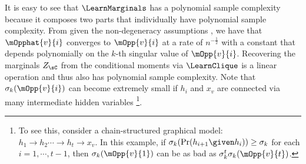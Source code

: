 It is easy to see that $\LearnMarginals$ has a polynomial sample complexity because it composes two parts that individually have polynomial sample complexity.
From \citet{anandkumar13tensor} given the non-degeneracy assumptions
  , we have that $\mOpphat{v}{i}$
  converges to $\mOpp{v}{i}$ at a rate of $n^{-\frac12}$ with a constant
  that depends polynomially on the $k$-th singular value of
  $\mOpp{v}{i}$.
Recovering the marginals $Z_\sC$ from the conditional moments via $\LearnClique$ is a linear operation and thus also has polynomial sample complexity. 
Note that $\sigma_{k}(\mOpp{v}{i})$ can become extremely
small if $h_i$ and $x_v$ are connected via many intermediate hidden variables
\footnote{To see this, consider a chain-structured graphical model: $h_1
\to h_2 \cdots \to h_t \to x_v$. In this example, if
$\sigma_k(\Pr(h_{i+1} \given h_{i})) \ge \sigma_k$ for each $i = 1,
\cdots, t-1$, then $\sigma_k(\mOpp{v}{1})$ can be as bad as
$\sigma_k^t \sigma_k(\mOpp{v}{t})$.}.


